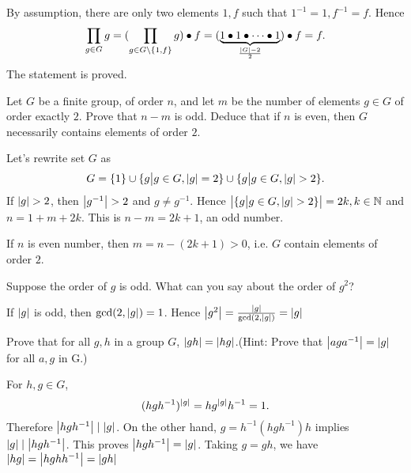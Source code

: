 \begin{solution}
By assumption, there are only two elements $1, f$ such that $1^{-1} = 1, f^{-1} = f$. Hence 
$$\prod_{g\in G}g = (\prod_{g\in G\setminus \{1,f\}}g) \bullet f = (\underbrace{1\bullet 1\bullet \cdots 
\bullet 1}_{\frac{\left|G\right| -2}{2}}) \bullet f = f.$$
The statement is proved.
\end{solution}

\begin{problem}[1.9]
Let $G$ be a finite group, of order $n$, and let $m$ be the number of elements $g \in G$
of order exactly $2$. Prove that $n-m$ is odd. Deduce that if $n$ is even, then
$G$ necessarily contains elements of order $2$.
\end{problem}

\begin{solution}
Let's rewrite set $G$ as
$$G = \{1\} \cup \{g\big{|} g\in G, \left|g\right| = 2\}\cup \{g\big{|} g\in G, \left|g\right| > 2\}.$$ 
If $\left|g\right| > 2$, then $\left|g^{-1}\right| > 2$ and $g\neq g^{-1}$. Hence $\left|\{g\big{|} g\in G, \left|g\right| > 2\}\right| = 2k,k\in \mathbb{N}$ and 
$n=1+m+2k$. This is $n-m=2k+1$, an odd number. 

If $n$ is even number, then $m = n - (2k+1) > 0$, i.e. $G$ contain elements of order $2$. 
\end{solution}

\begin{problem}[1.10]
Suppose the order of $g$ is odd. What can you say about the order of $g^2$?
\end{problem}

\begin{solution}
If $\left|g\right|$ is odd, then $\gcd(2,\left|g\right|) = 1$. Hence $\left|g^2\right| = \frac{\left|g\right|}{\gcd(2,\left|g\right|)} = \left|g\right|$
\end{solution}

\begin{problem}[1.11]
Prove that for all $g,h$ in a group $G$, $\left|gh\right|=\left|hg\right|$.(Hint: Prove that $\left|aga^{-1}\right|=\left|g\right|$ for all $a,g$ in G.)
\end{problem}

\begin{solution}
For $h,g\in G$, 
$$(hgh^{-1})^{\left|g\right|} = hg^{\left|g\right|}h^{-1} = 1.$$ Therefore $\left|hgh^{-1}\right|\mid \left|g\right|$.
On the other hand, $g=h^{-1}(hgh^{-1})h$ implies $\left|g\right| \mid \left|hgh^{-1}\right|$.
This proves $\left|hgh^{-1}\right|=\left|g\right|$. Taking $g=gh$, we have 
$\left|hg\right| = \left|hghh^{-1}\right|=\left|gh\right|$
\end{solution}

